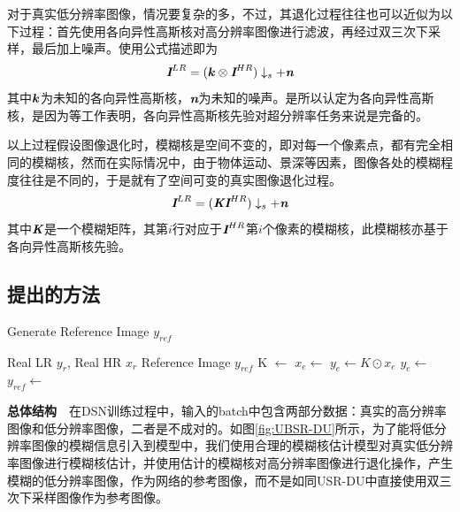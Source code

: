 对于真实低分辨率图像，情况要复杂的多，不过，其退化过程往往也可以近似为以下过程：首先使用各向异性高斯核对高分辨率图像进行滤波，再经过双三次下采样，最后加上噪声。使用公式描述即为
\begin{equation}
    \textbf{\em I}^{LR}=(\vb*{k}\otimes \textbf{\em I}^{HR})\downarrow_s+\textbf{\em n}
\end{equation}
其中$\vb*{k}$为未知的各向异性高斯核，$\textbf{\em n}$为未知的噪声。是所以认定为各向异性高斯核，是因为\parencite{Gau_1}\parencite{Gau_2}\parencite{Gau_3}\parencite{Gau_4}\parencite{Gau_5}等工作表明，各向异性高斯核先验对超分辨率任务来说是完备的。

以上过程假设图像退化时，模糊核是空间不变的，即对每一个像素点，都有完全相同的模糊核，然而在实际情况中，由于物体运动、景深等因素，图像各处的模糊程度往往是不同的，于是就有了空间可变的真实图像退化过程。
\begin{equation}
    \textbf{\em I}^{LR}=(\textbf{\em K}\textbf{\em I}^{HR})\downarrow_s+\textbf{\em n}\label{equ:degrade_sv}
\end{equation}
其中$\textbf{\em K}$是一个模糊矩阵，其第$i$行对应于$\textbf{\em I}^{HR}$第$i$个像素的模糊核，此模糊核亦基于各向异性高斯核先验。
\subsection{提出的方法}

\begin{algorithm}
    \caption{Generate Reference Image $y_{ref}$}
    \label{alg:y_ref}
    \begin{algorithmic}[1]
        \Require Real LR $y_r$, Real HR $x_r$
        \Ensure Reference Image $y_{ref}$
        \State K $\leftarrow $
        \State $x_{e} \leftarrow$ 
        \State $y_{e} \leftarrow K \odot x_{e}$
        \State $y_{e} \leftarrow$ 
        \State $y_{ref} \leftarrow$ 
    \end{algorithmic}
\end{algorithm}


\noindent\textbf{总体结构}\ \ 在DSN训练过程中，输入的batch中包含两部分数据：真实的高分辨率图像和低分辨率图像，二者是不成对的。如图\ref{fig:UBSR-DU}所示，为了能将低分辨率图像的模糊信息引入到模型中，我们使用合理的模糊核估计模型对真实低分辨率图像进行模糊核估计，并使用估计的模糊核对高分辨率图像进行退化操作，产生模糊的低分辨率图像，作为网络的参考图像，而不是如同USR-DU中直接使用双三次下采样图像作为参考图像。

